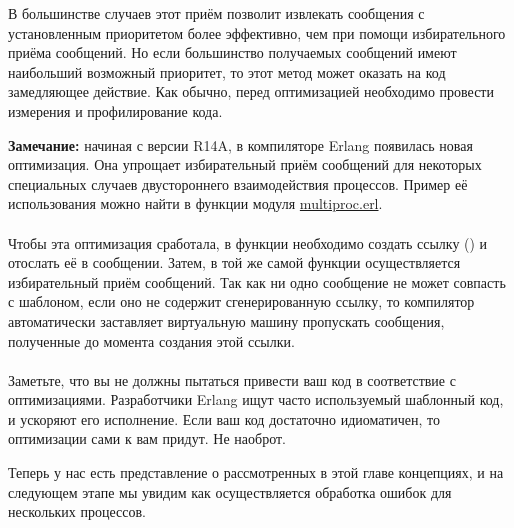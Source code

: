 В большинстве случаев этот приём позволит извлекать сообщения с установленным приоритетом более эффективно, чем при помощи избирательного приёма сообщений.
Но если большинство получаемых сообщений имеют наибольший возможный приоритет, то этот метод может оказать на код замедляющее действие.
Как обычно, перед оптимизацией необходимо провести измерения и профилирование кода.\\
\colorbox{lgray}
{
\begin{minipage}{1.0\linewidth}
    \textbf{Замечание:} начиная с версии R14A, в компиляторе Erlang появилась новая оптимизация.
    Она упрощает избирательный приём сообщений для некоторых специальных случаев двустороннего взаимодействия процессов.
    Пример её использования можно найти в функции  модуля \href{http://learnyousomeerlang.com/static/erlang/multiproc.erl}{multiproc.erl}.\\
    \\
    Чтобы эта оптимизация сработала, в функции необходимо создать ссылку () и отослать её в сообщении.
    Затем, в той же самой функции осуществляется избирательный приём сообщений.
    Так как ни одно сообщение не может совпасть с шаблоном, если оно не содержит сгенерированную ссылку, то компилятор автоматически заставляет виртуальную машину пропускать сообщения, полученные до момента создания этой ссылки.\\
    \\
    Заметьте, что вы не должны пытаться привести ваш код в соответствие с оптимизациями.
    Разработчики Erlang ищут часто используемый шаблонный код, и ускоряют его исполнение.
    Если ваш код достаточно идиоматичен, то оптимизации сами к вам придут.
    Не наоброт.
\end{minipage}
}

Теперь у нас есть представление о рассмотренных в этой главе концепциях, и на следующем этапе мы увидим как осуществляется обработка ошибок для нескольких процессов.
